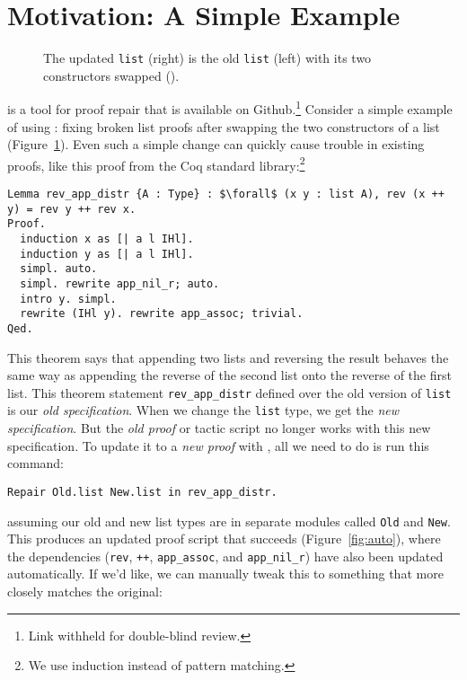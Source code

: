 \section{Motivation: A Simple Example}
\label{sec:overview}

\begin{figure}
\begin{minipage}{0.46\textwidth}
   
\end{minipage}
\hfill
\begin{minipage}{0.46\textwidth}
   
\end{minipage}
\caption{The updated \lstinline{list} (right) is the old \lstinline{list} (left) with its two constructors swapped ().}
\label{fig:listswap}
\end{figure}

\toolname is a tool for proof repair that is available on Github.\footnote{Link withheld for double-blind review.}
Consider a simple example of using \toolname: fixing broken list proofs after swapping the two constructors of a list (Figure~\ref{fig:listswap}).
Even such a simple change can quickly cause trouble in existing proofs, like this proof from the Coq standard library:\footnote{We use induction instead of pattern matching.}

\begin{lstlisting}
Lemma rev_app_distr {A : Type} : $\forall$ (x y : list A), rev (x ++ y) = rev y ++ rev x.
Proof.
  induction x as [| a l IHl].
  induction y as [| a l IHl].
  simpl. auto.
  simpl. rewrite app_nil_r; auto.
  intro y. simpl.
  rewrite (IHl y). rewrite app_assoc; trivial.
Qed.
\end{lstlisting}
This theorem says that appending two lists and reversing the result behaves the same way as appending
the reverse of the second list onto the reverse of the first list.
This theorem statement \lstinline{rev_app_distr} defined over the old version of \lstinline{list} is our \textit{old specification}.
When we change the \lstinline{list} type, we get the \textit{new specification}.
But the \textit{old proof} or tactic script no longer works with this new specification.
To update it to a \textit{new proof} with \toolname, all we need to do is run this command:

\begin{lstlisting}
Repair Old.list New.list in rev_app_distr.
\end{lstlisting}
assuming our old and new list types are in separate modules called \lstinline{Old} and \lstinline{New}.
This produces an updated proof script that succeeds (Figure~\ref{fig:auto}),
where the dependencies (\lstinline{rev}, \lstinline{++}, \lstinline{app_assoc}, and \lstinline{app_nil_r}) have
also been updated automatically.
If we'd like, we can manually tweak this to something that more closely matches the original:

